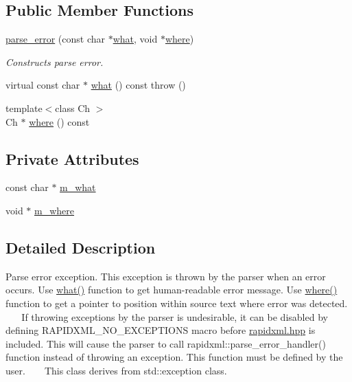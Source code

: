 \subsection*{Public Member Functions}
\begin{DoxyCompactItemize}
\item 
\mbox{\hyperlink{classrapidxml_1_1parse__error_aea12a301271c393fb627b368fb9f35c1}{parse\+\_\+error}} (const char $\ast$\mbox{\hyperlink{classrapidxml_1_1parse__error_a986003116ebcb49a69a20228da306232}{what}}, void $\ast$\mbox{\hyperlink{classrapidxml_1_1parse__error_ab139528f4d9e960f0ee807d22d6c032d}{where}})
\begin{DoxyCompactList}\small\item\em Constructs parse error. \end{DoxyCompactList}\item 
virtual const char $\ast$ \mbox{\hyperlink{classrapidxml_1_1parse__error_a986003116ebcb49a69a20228da306232}{what}} () const  throw ()
\item 
{\footnotesize template$<$class Ch $>$ }\\Ch $\ast$ \mbox{\hyperlink{classrapidxml_1_1parse__error_ab139528f4d9e960f0ee807d22d6c032d}{where}} () const
\end{DoxyCompactItemize}
\subsection*{Private Attributes}
\begin{DoxyCompactItemize}
\item 
const char $\ast$ \mbox{\hyperlink{classrapidxml_1_1parse__error_a41bffadc72eec238cf4b7d14c10c16ca}{m\+\_\+what}}
\item 
void $\ast$ \mbox{\hyperlink{classrapidxml_1_1parse__error_aa5a164653ac347adddf47b264620d80f}{m\+\_\+where}}
\end{DoxyCompactItemize}


\subsection{Detailed Description}
Parse error exception. This exception is thrown by the parser when an error occurs. Use \mbox{\hyperlink{classrapidxml_1_1parse__error_a986003116ebcb49a69a20228da306232}{what()}} function to get human-\/readable error message. Use \mbox{\hyperlink{classrapidxml_1_1parse__error_ab139528f4d9e960f0ee807d22d6c032d}{where()}} function to get a pointer to position within source text where error was detected. ~\newline
~\newline
 If throwing exceptions by the parser is undesirable, it can be disabled by defining R\+A\+P\+I\+D\+X\+M\+L\+\_\+\+N\+O\+\_\+\+E\+X\+C\+E\+P\+T\+I\+O\+NS macro before \mbox{\hyperlink{rapidxml_8hpp}{rapidxml.\+hpp}} is included. This will cause the parser to call rapidxml\+::parse\+\_\+error\+\_\+handler() function instead of throwing an exception. This function must be defined by the user. ~\newline
~\newline
 This class derives from {\ttfamily std\+::exception} class. 

